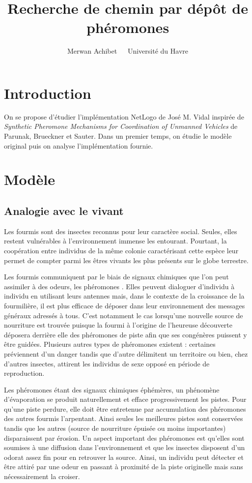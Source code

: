 \documentclass[12pt]{article}
\title{Recherche de chemin par dépôt de phéromones}
\author{Merwan Achibet $\;$ \textendash $\;$ Université du Havre}
\date{}
\begin{document}
\maketitle

\section*{Introduction}

On se propose d'étudier l'implémentation NetLogo de José M. Vidal
inspirée de \textit{Synthetic Pheromone Mechanisms for Coordination of
  Unmanned Vehicles} de Parunak, Brueckner et Sauter. Dans un premier
temps, on étudie le modèle original puis on analyse l'implémentation
fournie.

\section{Modèle}

\subsection{Analogie avec le vivant}

Les fourmis sont des insectes reconnus pour leur caractère
social. Seules, elles restent vulnérables à l'environnement immense
les entourant. Pourtant, la coopération entre individus de la même
colonie caractérisant cette espèce leur permet de compter parmi les
êtres vivants les plus présents sur le globe terrestre.

Les fourmis communiquent par le biais de signaux chimiques que l'on
peut assimiler à des odeurs, les phéromones \cite{insectes}. Elles
peuvent dialoguer d'individu à individu en utilisant leurs antennes
mais, dans le contexte de la croissance de la fourmilière, il est plus
efficace de déposer dans leur environnement des messages généraux
adressés à tous. C'est notamment le cas lorsqu'une nouvelle source de
nourriture est trouvée puisque la fourmi à l'origine de l'heureuse
découverte déposera derrière elle des phéromones de piste afin que ses
congénères puissent y être guidées. Plusieurs autres types de
phéromones existent : certaines préviennent d'un danger tandis que
d'autre délimitent un territoire ou bien, chez d'autres insectes,
attirent les individus de sexe opposé en période de reproduction.

Les phéromones étant des signaux chimiques éphémères, un phénomène
d'évaporation se produit naturellement et efface progressivement les
pistes.  Pour qu'une piste perdure, elle doit être entretenue par
accumulation des phéromones des autres fourmis l'arpentant. Ainsi
seules les meilleures pistes sont conservées tandis que les autres
(source de nourriture épuisée ou moins importantes) disparaissent par
érosion.  Un aspect important des phéromones est qu'elles sont
soumises à une diffusion dans l'environnement et que les insectes
disposent d'un odorat assez fin pour en retrouver la source. Ainsi, un
individu peut détecter et être attiré par une odeur en passant à
proximité de la piste originelle mais sans nécessairement la croiser.
\end{document}

